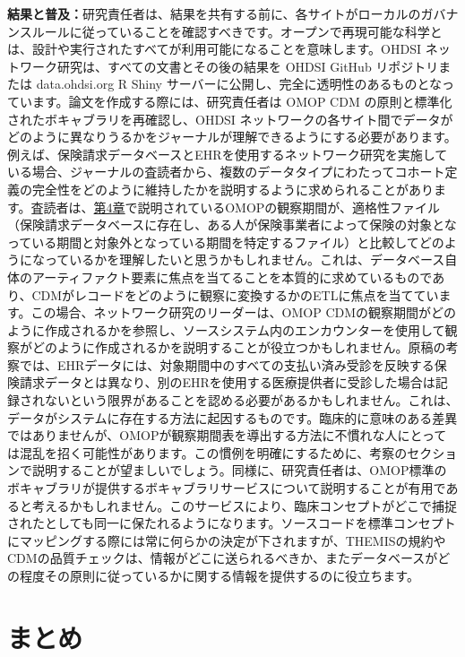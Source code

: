 \documentclass[
  11pt]{book}
\theoremstyle{definition}
\theoremstyle{definition}
\theoremstyle{definition}
\theoremstyle{definition}
\theoremstyle{remark}
\begin{document}
\textbf{結果と普及：}研究責任者は、結果を共有する前に、各サイトがローカルのガバナンスルールに従っていることを確認すべきです。オープンで再現可能な科学とは、設計や実行されたすべてが利用可能になることを意味します。OHDSI ネットワーク研究は、すべての文書とその後の結果を OHDSI GitHub リポジトリまたは data.ohdsi.org R Shiny サーバーに公開し、完全に透明性のあるものとなっています。論文を作成する際には、研究責任者は OMOP CDM の原則と標準化されたボキャブラリを再確認し、OHDSI ネットワークの各サイト間でデータがどのように異なりうるかをジャーナルが理解できるようにする必要があります。例えば、保険請求データベースとEHRを使用するネットワーク研究を実施している場合、ジャーナルの査読者から、複数のデータタイプにわたってコホート定義の完全性をどのように維持したかを説明するように求められることがあります。査読者は、\href{https://ohdsi.github.io/TheBookOfOhdsi/CommonDataModel.html\#CommonDataModel}{第4章}で説明されているOMOPの観察期間が、適格性ファイル（保険請求データベースに存在し、ある人が保険事業者によって保険の対象となっている期間と対象外となっている期間を特定するファイル）と比較してどのようになっているかを理解したいと思うかもしれません。これは、データベース自体のアーティファクト要素に焦点を当てることを本質的に求めているものであり、CDMがレコードをどのように観察に変換するかのETLに焦点を当てています。この場合、ネットワーク研究のリーダーは、OMOP CDMの観察期間がどのように作成されるかを参照し、ソースシステム内のエンカウンターを使用して観察がどのように作成されるかを説明することが役立つかもしれません。原稿の考察では、EHRデータには、対象期間中のすべての支払い済み受診を反映する保険請求データとは異なり、別のEHRを使用する医療提供者に受診した場合は記録されないという限界があることを認める必要があるかもしれません。これは、データがシステムに存在する方法に起因するものです。臨床的に意味のある差異ではありませんが、OMOPが観察期間表を導出する方法に不慣れな人にとっては混乱を招く可能性があります。この慣例を明確にするために、考察のセクションで説明することが望ましいでしょう。同様に、研究責任者は、OMOP標準のボキャブラリが提供するボキャブラリサービスについて説明することが有用であると考えるかもしれません。このサービスにより、臨床コンセプトがどこで捕捉されたとしても同一に保たれるようになります。ソースコードを標準コンセプトにマッピングする際には常に何らかの決定が下されますが、THEMISの規約やCDMの品質チェックは、情報がどこに送られるべきか、またデータベースがどの程度その原則に従っているかに関する情報を提供するのに役立ちます。

\section{まとめ}\label{ux307eux3068ux3081-16}
\end{document}
